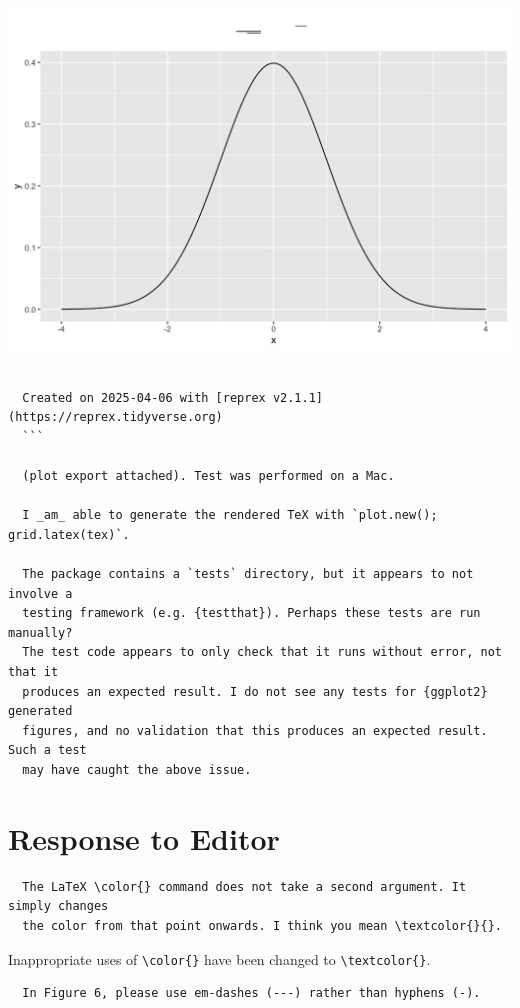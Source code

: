 \documentclass{article}
\begin{document}
\includegraphics[width=\textwidth]{plot_issue.png}

\begin{verbatim}

  Created on 2025-04-06 with [reprex v2.1.1](https://reprex.tidyverse.org)
  ```

  (plot export attached). Test was performed on a Mac.
  
  I _am_ able to generate the rendered TeX with `plot.new(); grid.latex(tex)`.

  The package contains a `tests` directory, but it appears to not involve a 
  testing framework (e.g. {testthat}). Perhaps these tests are run manually? 
  The test code appears to only check that it runs without error, not that it 
  produces an expected result. I do not see any tests for {ggplot2} generated 
  figures, and no validation that this produces an expected result. Such a test
  may have caught the above issue.
\end{verbatim}

\section*{Response to Editor}

\begin{verbatim}
  The LaTeX \color{} command does not take a second argument. It simply changes
  the color from that point onwards. I think you mean \textcolor{}{}.
\end{verbatim}

Inappropriate uses of \verb|\color{}| have been changed to 
\verb|\textcolor{}|.

\begin{verbatim}
  In Figure 6, please use em-dashes (---) rather than hyphens (-).
\end{verbatim}
\end{document}
